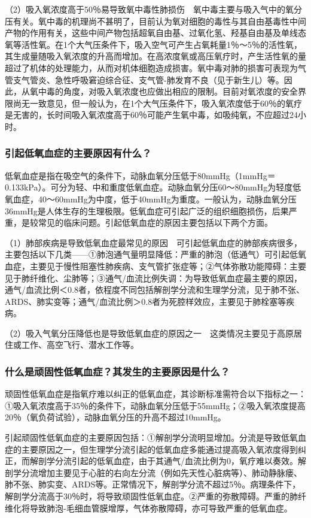 （2）吸入氧浓度高于50％易导致氧中毒性肺损伤　氧中毒主要与吸入气中的氧分压有关。氧中毒的机理尚不甚明了，目前认为氧对细胞的毒性与其自由基毒性中间产物的作用有关，这些中间产物包括超氧自由基、过氧化氢、羟基自由基及单线态氧等活性氧。在1个大气压条件下，吸入空气可产生占氧耗量1％～5％的活性氧，其生成量随吸入氧浓度的升高而增加。在高浓度氧或高压氧疗时，产生活性氧的量超过了机体的处理能力，从而对机体细胞造成损害。氧中毒对肺的损害可表现为气管支气管炎、急性呼吸窘迫综合征、支气管-肺发育不良（见于新生儿）等。因此，从氧中毒的角度，对吸入氧浓度也应做出相应的限制。目前对氧浓度的安全界限尚无一致意见，但一般认为，在1个大气压条件下，吸入氧浓度低于60％的氧疗是无害的，长时间吸入氧浓度高于60％可能产生氧中毒，如吸纯氧，不应超过24小时。

\subsubsection{引起低氧血症的主要原因有什么？}

低氧血症是指在吸空气的条件下，动脉血氧分压低于80mmHg（1mmHg＝0.133kPa）。可分为轻、中和重度低氧血症。动脉血氧分压60～80mmHg为轻度低氧血症，40～60mmHg为中度，低于40mmHg为重度。一般认为，动脉血氧分压36mmHg是人体生存的生理极限。低氧血症可引起广泛的组织细胞损伤，后果严重，是较常见的临床问题。引起低氧血症的原因主要包括以下两个方面。

（1）肺部疾病是导致低氧血症最常见的原因　可引起低氧血症的肺部疾病很多，主要包括以下几类------①肺泡通气量明显降低：严重的肺泡（低通气）可引起低氧血症，主要见于慢性阻塞性肺疾病、支气管扩张症等；②气体弥散功能障碍：主要见于肺纤维化、尘肺等；③通气/血流比例失调：为导致低氧血症最主要的原因，通气/血流比例＜0.8者，依程度不同包括解剖学分流和生理学分流，见于肺不张、ARDS、肺实变等；通气/血流比例＞0.8者为死腔样效应，主要见于肺栓塞等疾病。

（2）吸入气氧分压降低也是导致低氧血症的原因之一　这类情况主要见于高原居住或工作、高空飞行、潜水工作等。

\subsubsection{什么是顽固性低氧血症？其发生的主要原因是什么？}

顽固性低氧血症是指氧疗难以纠正的低氧血症，其诊断标准需符合以下指标之一：①吸入氧浓度高于35％的条件下，动脉血氧分压低于55mmHg；②吸入氧浓度提高20％（氧负荷试验），动脉血氧分压的升高不超过10mmHg。

引起顽固性低氧血症的主要原因包括：①解剖学分流明显增加。分流是导致低氧血症的主要原因之一，但生理学分流引起的低氧血症多能通过提高吸入氧浓度得到纠正，而解剖学分流引起的低氧血症，由于其通气/血流比例为0，氧疗难以奏效。解剖学分流增加主要见于心脏的右向左分流（例如先天性心脏病等）、肺动静脉瘘、肺不张、肺实变、ARDS等。正常情况下，解剖学分流不超过5％。病理条件下，解剖学分流高于30％时，将导致顽固性低氧血症。②严重的弥散障碍。严重的肺纤维化将导致肺泡-毛细血管膜增厚，气体弥散障碍，亦可导致严重的低氧血症。

